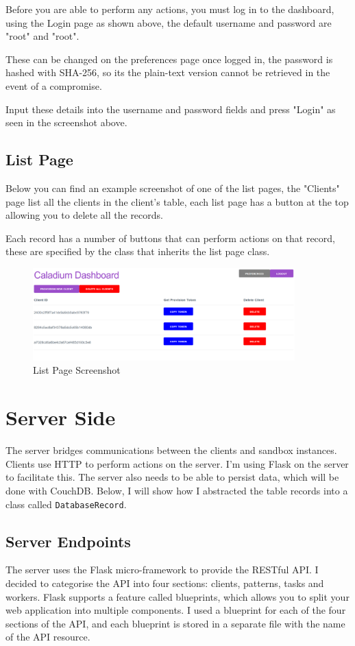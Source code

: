 Before you are able to perform any actions,
you must log in to the dashboard,
using the Login page as shown above,
the default username and password are "root" and "root".

These can be changed on the preferences page once logged in,
the password is hashed with SHA-256, so its
the plain-text version cannot be retrieved in the event of a compromise.

Input these details into the username and password fields
and press "Login" as seen in the screenshot above.

\subsection{List Page}
Below you can find an example screenshot of one of the list pages,
the "Clients" page list all the clients in the client's table,
each list page has a button at the top allowing you to delete all the records.

Each record has a number of buttons that can perform actions on that record,
these are specified by the class that inherits the list page class.

\begin{figure}[h!]
    \centering
    \includegraphics[width=0.9\textwidth]{images/screenshots/list_page}
    \caption{List Page Screenshot}
    \label{image:listPageScreenshot}
\end{figure}

\section{Server Side}
The server bridges communications between the clients and sandbox instances.
Clients use HTTP to perform actions on the server.
I'm using Flask on the server to facilitate this.
The server also needs to be able to persist data,
which will be done with CouchDB.
Below, I will show how I abstracted the table
records into a class called \texttt{DatabaseRecord}.

\subsection{Server Endpoints}
The server uses the Flask micro-framework to provide the RESTful API.
I decided to categorise the API into four sections:
clients, patterns, tasks and workers.
Flask supports a feature called blueprints,
which allows you to split your web application into multiple components.
I used a blueprint for each of the four sections of the API,
and each blueprint is stored in a separate file
with the name of the API resource.

